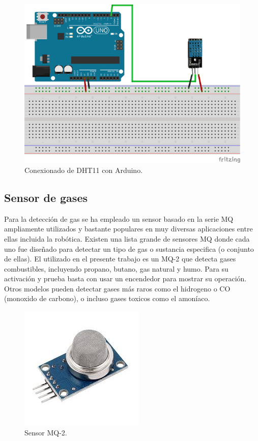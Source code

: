 \begin{figure}[H]
  \begin{center}
    \includegraphics[scale=0.6]{imagenes/dth11_conexionado.jpg}
  \end{center}
  \caption{Conexionado de DHT11 con Arduino.}
  \label{figura:sensor_dth11_bits}
\end{figure}

\subsection{Sensor de gases}


Para la detección de gas se ha empleado un sensor basado en la serie MQ ampliamente utilizados y bastante populares en muy diversas aplicaciones entre ellas incluida la robótica.
Existen una lista grande de sensores MQ donde cada uno fue diseñado para detectar un tipo de gas o sustancia especifica (o conjunto de ellas). El utilizado en el presente trabajo 
es un MQ-2 que detecta gases combustibles, incluyendo propano, butano, gas natural y humo. Para su activación y prueba basta con usar un encendedor para mostrar su operación. 
Otros modelos pueden detectar gases más raros como el hidrogeno o CO (monoxido de carbono), o incluso gases toxicos como el amoníaco.\\

\begin{figure}[H]
  \begin{center}
    \includegraphics[scale=0.6]{imagenes/mq2_sensor.jpeg}
  \end{center}
  \caption{Sensor MQ-2.}
  \label{figura:sensor_mq_2}
\end{figure}

